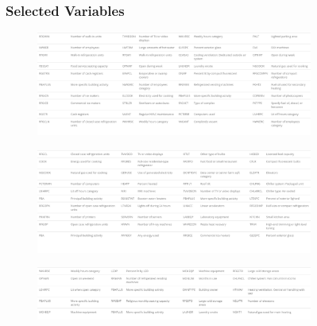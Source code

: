 \begin{figure}[ht]
\subsubsection{Selected Variables}
\label{appendix_nn:electricity:nn_full_variables}
\begin{subfigure}{1\textwidth}
\centering
\includegraphics[width=.99\textwidth, height=0.35\textheight]{Images/electricity_psf_nn_full_variables_1.png}
\end{subfigure}
\begin{subfigure}{1\textwidth}
\centering
\includegraphics[width=.99\textwidth, height=0.35\textheight]{Images/electricity_psf_nn_full_variables_2.png}
\end{subfigure}
\begin{subfigure}{1\textwidth}
\centering
\includegraphics[width=.99\textwidth, height=0.18\textheight]{Images/electricity_psf_nn_full_variables_3.png}
\end{subfigure}
\end{figure}
\FloatBarrier
\newpage
